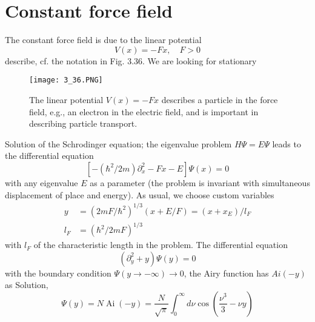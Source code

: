 \section{Constant force field}
The constant force field is due to the linear potential
\begin{equation}
    V(x)=-F x, \quad F>0
    \end{equation}
describe, cf. the notation in Fig. 3.36. We are looking for stationary
\begin{figure}[ht]
    \begin{minipage}{0.5\textwidth}
        \centering
        \texttt{[image: 3\_36.PNG]}
    \end{minipage}
    \begin{minipage}{0.5\textwidth}
        \caption{The linear potential $V (x) = -F x$ describes a particle in the force field, e.g., an electron in the electric field, and is important in describing particle transport.}
    \end{minipage}
\end{figure}
Solution of the Schrodinger equation; the eigenvalue problem $H\Psi=E\Psi$ leads to the differential equation
\begin{equation}
    \left[-\left(\hbar^{2} / 2 m\right) \partial_{x}^{2}-F x-E\right] \Psi(x)=0
    \end{equation}
with any eigenvalue $E$ as a parameter (the problem is invariant with simultaneous displacement of place and energy). As usual, we choose custom variables
\begin{equation}
\begin{aligned} y &=\left(2 m F / \hbar^{2}\right)^{1 / 3}(x+E / F)=\left(x+x_{E}\right) / l_{F} \\ l_{F} &=\left(\hbar^{2} / 2 m F\right)^{1 / 3} \end{aligned}
\end{equation}
with $l_F$ of the characteristic length in the problem. The differential equation
\begin{equation}
    \left(\partial_{y}^{2}+y\right) \Psi(y)=0
    \end{equation}
with the boundary condition $\Psi(y\to -\infty)\to 0$, the Airy function has $Ai (-y)$ as
Solution,
\begin{equation}
    \Psi(y)=N \operatorname{Ai}(-y)=\frac{N}{\sqrt{\pi}} \int_{0}^{\infty} d \nu \cos \left(\frac{\nu^{3}}{3}-\nu y\right)
    \end{equation}
